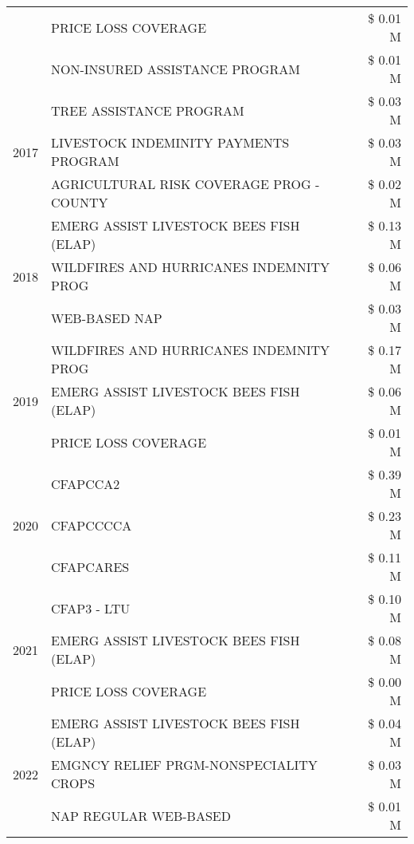\begin{tabular}{llr}
 & PRICE LOSS COVERAGE & \$ 0.01 M \\
 & NON-INSURED ASSISTANCE PROGRAM & \$ 0.01 M \\
\cline{1-3}
\multirow[t]{3}{*}{2017} & TREE ASSISTANCE PROGRAM & \$ 0.03 M \\
 & LIVESTOCK INDEMINITY PAYMENTS PROGRAM & \$ 0.03 M \\
 & AGRICULTURAL RISK COVERAGE PROG - COUNTY & \$ 0.02 M \\
\cline{1-3}
\multirow[t]{3}{*}{2018} & EMERG ASSIST LIVESTOCK BEES FISH (ELAP) & \$ 0.13 M \\
 & WILDFIRES AND HURRICANES INDEMNITY PROG & \$ 0.06 M \\
 & WEB-BASED NAP & \$ 0.03 M \\
\cline{1-3}
\multirow[t]{3}{*}{2019} & WILDFIRES AND HURRICANES INDEMNITY PROG & \$ 0.17 M \\
 & EMERG ASSIST LIVESTOCK BEES FISH (ELAP) & \$ 0.06 M \\
 & PRICE LOSS COVERAGE & \$ 0.01 M \\
\cline{1-3}
\multirow[t]{3}{*}{2020} & CFAPCCA2 & \$ 0.39 M \\
 & CFAPCCCCA & \$ 0.23 M \\
 & CFAPCARES & \$ 0.11 M \\
\cline{1-3}
\multirow[t]{3}{*}{2021} & CFAP3 - LTU & \$ 0.10 M \\
 & EMERG ASSIST LIVESTOCK BEES FISH (ELAP) & \$ 0.08 M \\
 & PRICE LOSS COVERAGE & \$ 0.00 M \\
\cline{1-3}
\multirow[t]{3}{*}{2022} & EMERG ASSIST LIVESTOCK BEES FISH (ELAP) & \$ 0.04 M \\
 & EMGNCY RELIEF PRGM-NONSPECIALITY CROPS & \$ 0.03 M \\
 & NAP REGULAR WEB-BASED & \$ 0.01 M \\
\cline{1-3}
\bottomrule
\end{tabular}
